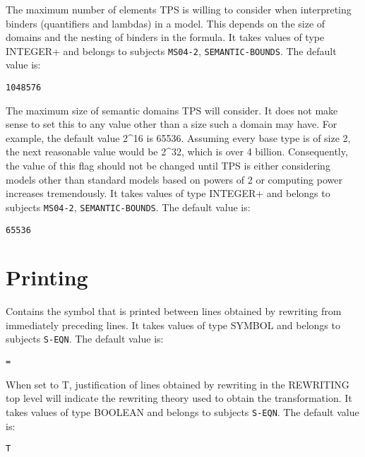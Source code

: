 \begin{description} 
\item[MAX-BINDER-COMPUTATION]  
The maximum number of elements TPS is willing to consider when
interpreting binders (quantifiers and lambdas) in a model.  This depends on the size of
domains and the nesting of binders in the formula.
It takes values of type INTEGER+ and belongs to subjects \texttt{MS04-2}, \texttt{SEMANTIC-BOUNDS}.  The default value is: \begin{lstlisting}
1048576
\end{lstlisting}

\item[MAX-DOMAIN-SIZE]  
The maximum size of semantic domains TPS will consider. It does not
make sense to set this to any value other than a size such a domain
may have.  For example, the default value 2\textasciicircum 16 is 65536.  Assuming
every base type is of size 2, the next reasonable value would be 2\textasciicircum 32,
which is over 4 billion.  Consequently, the value of this flag should
not be changed until TPS is either considering models other than
standard models based on powers of 2 or computing power increases
tremendously.
It takes values of type INTEGER+ and belongs to subjects \texttt{MS04-2}, \texttt{SEMANTIC-BOUNDS}.  The default value is: \begin{lstlisting}
65536
\end{lstlisting}

\item
\end{description}

\section{Printing}

\begin{description} 
\item[REWRITING-RELATION-SYMBOL]  
Contains the symbol that is printed between lines obtained
by rewriting from immediately preceding lines.
It takes values of type SYMBOL and belongs to subjects \texttt{S-EQN}.  The default value is: \begin{lstlisting}
=
\end{lstlisting}

\item[VERBOSE-REWRITE-JUSTIFICATION]  
When set to T, justification of lines obtained by rewriting
in the REWRITING top level will indicate the rewriting theory used to
obtain the transformation.
It takes values of type BOOLEAN and belongs to subjects \texttt{S-EQN}.  The default value is: \begin{lstlisting}
T
\end{lstlisting}

\item
\end{description}


